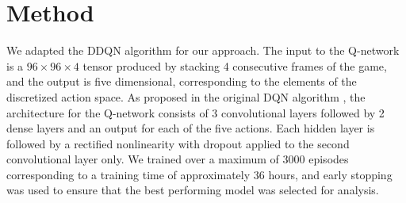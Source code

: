 \documentclass{article}
\begin{document}
\section{Method}
We adapted the DDQN algorithm \cite{DDQN} for our approach. The input to the Q-network is a $96\times96\times4$ tensor produced by stacking 4 consecutive frames of the game, and the output is five dimensional, corresponding to the elements of the discretized action space. As proposed in the original DQN algorithm \cite{DQN}, the architecture for the Q-network consists of 3 convolutional layers followed by 2 dense layers and an output for each of the five actions. Each hidden layer is followed by a rectified nonlinearity with dropout applied to the second convolutional layer only. We trained over a maximum of 3000 episodes corresponding to a training time of approximately 36 hours, and early stopping was used to ensure that the best performing model was selected for analysis.
\end{document}
